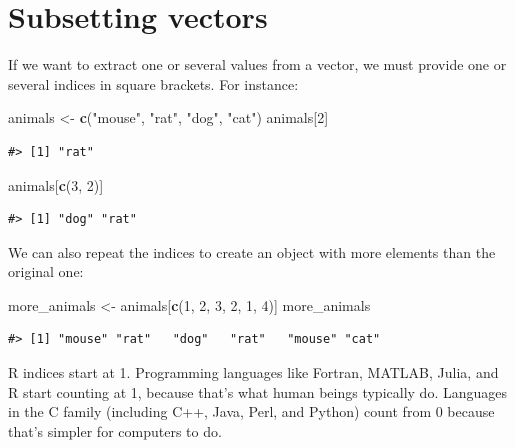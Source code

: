 \documentclass[]{book}
\newenvironment{Shaded}{\begin{snugshade}}{\end{snugshade}}
\newcommand{\KeywordTok}[1]{\textcolor[rgb]{0.13,0.29,0.53}{\textbf{#1}}}
\newcommand{\DecValTok}[1]{\textcolor[rgb]{0.00,0.00,0.81}{#1}}
\newcommand{\StringTok}[1]{\textcolor[rgb]{0.31,0.60,0.02}{#1}}
\newcommand{\NormalTok}[1]{#1}
\begin{document}
\section{Subsetting vectors}\label{subsetting-vectors}

If we want to extract one or several values from a vector, we must
provide one or several indices in square brackets. For instance:

\begin{Shaded}
\begin{Highlighting}[]
\NormalTok{animals <-}\StringTok{ }\KeywordTok{c}\NormalTok{(}\StringTok{"mouse"}\NormalTok{, }\StringTok{"rat"}\NormalTok{, }\StringTok{"dog"}\NormalTok{, }\StringTok{"cat"}\NormalTok{)}
\NormalTok{animals[}\DecValTok{2}\NormalTok{]}
\end{Highlighting}
\end{Shaded}

\begin{verbatim}
#> [1] "rat"
\end{verbatim}

\begin{Shaded}
\begin{Highlighting}[]
\NormalTok{animals[}\KeywordTok{c}\NormalTok{(}\DecValTok{3}\NormalTok{, }\DecValTok{2}\NormalTok{)]}
\end{Highlighting}
\end{Shaded}

\begin{verbatim}
#> [1] "dog" "rat"
\end{verbatim}

We can also repeat the indices to create an object with more elements
than the original one:

\begin{Shaded}
\begin{Highlighting}[]
\NormalTok{more_animals <-}\StringTok{ }\NormalTok{animals[}\KeywordTok{c}\NormalTok{(}\DecValTok{1}\NormalTok{, }\DecValTok{2}\NormalTok{, }\DecValTok{3}\NormalTok{, }\DecValTok{2}\NormalTok{, }\DecValTok{1}\NormalTok{, }\DecValTok{4}\NormalTok{)]}
\NormalTok{more_animals}
\end{Highlighting}
\end{Shaded}

\begin{verbatim}
#> [1] "mouse" "rat"   "dog"   "rat"   "mouse" "cat"
\end{verbatim}

R indices start at 1. Programming languages like Fortran, MATLAB, Julia,
and R start counting at 1, because that's what human beings typically
do. Languages in the C family (including C++, Java, Perl, and Python)
count from 0 because that's simpler for computers to do.
\end{document}
